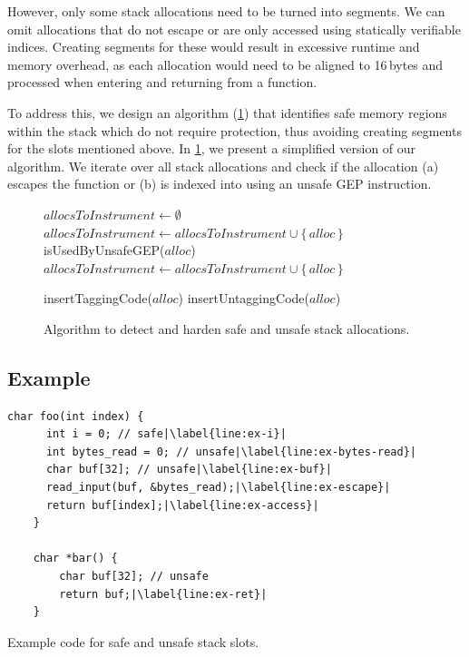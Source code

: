 However, only some stack allocations need to be turned into segments.
We can omit allocations that do not escape or are only accessed using statically verifiable indices.
Creating segments for these would result in excessive runtime and memory overhead, as each allocation would need to be aligned to 16\,bytes and processed when entering and returning from a function.

To address this, we design an algorithm (\cref{fig:stack-safety-pseudo}) that identifies safe memory regions within the stack which do not require protection, thus avoiding creating segments for the slots mentioned above.
In \cref{fig:stack-safety-pseudo}, we present a simplified version of our algorithm.
We iterate over all stack allocations and check if the allocation (a) escapes the function or (b) is indexed into using an unsafe \ac{GEP} instruction.

\begin{figure}
    \begin{algorithmic}
        \State $allocsToInstrument \gets \emptyset$
                \State $allocsToInstrument \gets allocsToInstrument \cup \{\,alloc\,\}$
            \ElsIf
                    {isUsedByUnsafeGEP($alloc$)}
                \State $allocsToInstrument \gets allocsToInstrument \cup \{\,alloc\,\}$
            \EndIf
        \EndFor

            \State insertTaggingCode($alloc$)
            \State insertUntaggingCode($alloc$)
        \EndFor
    \end{algorithmic}
    \caption{Algorithm to detect and harden safe and unsafe stack allocations.}
    \label{fig:stack-safety-pseudo}
\end{figure}

\subsection{Example}
\label{subsec:example2}

\begin{lstfloat}
    \begin{lstlisting}[frame=h,style=customc,
        label={lst:stack-safety-inner},escapechar=|]
    char foo(int index) {
      int i = 0; // safe|\label{line:ex-i}|
      int bytes_read = 0; // unsafe|\label{line:ex-bytes-read}|
      char buf[32]; // unsafe|\label{line:ex-buf}|
      read_input(buf, &bytes_read);|\label{line:ex-escape}|
      return buf[index];|\label{line:ex-access}|
    }

    char *bar() {
        char buf[32]; // unsafe
        return buf;|\label{line:ex-ret}|
    }
    \end{lstlisting}
    \caption{Example code for safe and unsafe stack slots.}
    \label{lst:stack-safety}
\end{lstfloat}

